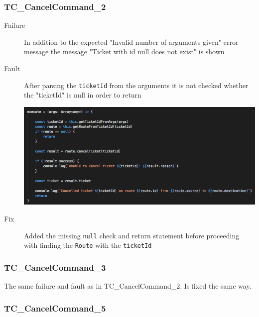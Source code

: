 \documentclass[11pt]{article}
\begin{document}
\subsubsection{TC\_CancelCommand\_2}
\label{sec:org06ffaf6}

\begin{description}
\item[{Failure}] In addition to the expected "Invalid number of arguments given" error message the message "Ticket with id null does not exist" is shown
\item[{Fault}] After parsing the \texttt{ticketId} from the arguments it is not checked whether the "ticketId" is null in order to return
\begin{center}
\includegraphics[width=.9\linewidth]{./Iteration3.rtfd/Pasted Graphic 12.tiff.png}
\end{center}
\item[{Fix}] Added the missing \texttt{null} check and return statement before proceeding with finding the \texttt{Route} with the \texttt{ticketId}
\end{description}

\subsubsection{TC\_CancelCommand\_3}
\label{sec:org876be42}

The same failure and fault as in TC\_CancelCommand\_2. Is fixed the same way.

\subsubsection{TC\_CancelCommand\_5}
\label{sec:org53a0fd4}
\end{document}
